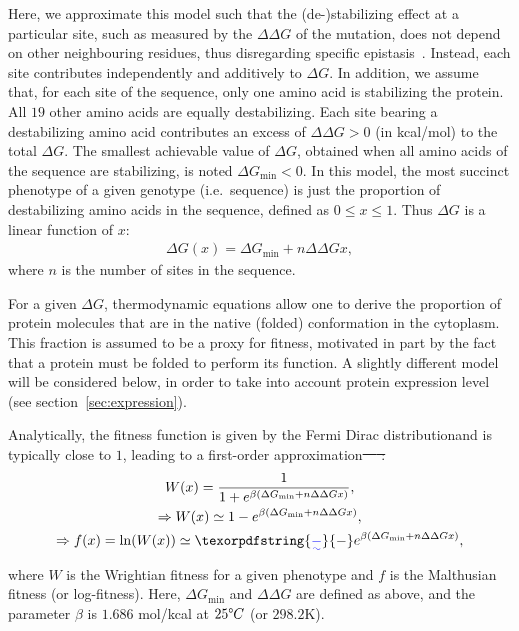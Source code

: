\documentclass[authoryear]{elsarticle} %
\newcommand{\wrightfit}{W} %
\newcommand{\logfit}{f} %
\newcommand{\NbrSites}{n} %
\newcommand{\G}{G} %
\newcommand{\DeltaG}{\Delta \G} %
\newcommand{\EmpiricalDeltaDeltaG}{\Delta \DeltaG} %
\newcommand{\EmpiricalDeltaGmin}{\DeltaG_{\text{min}}} %
\providecommand{\DIFaddtex}[1]{{\protect\color{blue}\uwave{#1}}} %
\providecommand{\DIFdeltex}[1]{{\protect\color{red}\sout{#1}}}                      %
\providecommand{\DIFaddbegin}{} %
\providecommand{\DIFaddend}{} %
\providecommand{\DIFdelbegin}{} %
\providecommand{\DIFdelend}{} %
\providecommand{\DIFadd}[1]{\texorpdfstring{\DIFaddtex{#1}}{#1}} %
\providecommand{\DIFdel}[1]{\texorpdfstring{\DIFdeltex{#1}}{}} %
\begin{document}
Here, we approximate this model such that the (de-)stabilizing effect at a particular site, such as measured by the $\EmpiricalDeltaDeltaG$ of the mutation, does not depend on other neighbouring residues, thus disregarding specific epistasis~\citep{Dasmeh2014}.
Instead, each site contributes independently and additively to $\DeltaG$.
In addition, we assume that, for each site of the sequence, only one amino acid is stabilizing the protein.
All $19$ other amino acids are equally destabilizing.
Each site bearing a destabilizing amino acid contributes an excess of $\EmpiricalDeltaDeltaG > 0$ (in kcal/mol) to the total $\DeltaG$.
The smallest achievable value of $\DeltaG$, obtained when all amino acids of the sequence are stabilizing, is noted $ \EmpiricalDeltaGmin < 0$.
In this model, the most succinct {phenotype} of a given genotype (i.e.~sequence) is just the proportion of destabilizing amino acids in the sequence, defined as $0 \leq x \leq 1$.
Thus $\DeltaG$ is a linear function of $x$:
\begin{align}
    \DeltaG (x) = \EmpiricalDeltaGmin + \NbrSites \EmpiricalDeltaDeltaG x,
\end{align}
where $\NbrSites$ is the number of sites in the sequence.

For a given $\DeltaG$, thermodynamic equations allow one to derive the proportion of protein molecules that are in the native (folded) conformation in the cytoplasm.
This fraction is assumed to be a proxy for fitness, motivated in part by the fact that a protein must be folded to perform its function.
A slightly different model will be considered below, in order to take into account protein expression level (see section~\ref{sec:expression}).

Analytically, the fitness function is given by the Fermi Dirac distribution\DIFaddbegin \DIFadd{~\mbox{%
\citep{Goldstein2011} }\hspace{0pt}%
}\DIFaddend and is typically close to $1$\DIFaddbegin \DIFadd{~\mbox{%
\citep{Serohijos2014}}\hspace{0pt}%
}\DIFaddend , leading to a first-order approximation\DIFdelbegin \DIFdel{~\mbox{%
\citep{Goldstein2011}}\hspace{0pt}%
:
}\DIFdelend \DIFaddbegin \DIFadd{:
}\DIFaddend \begin{gather}
    \wrightfit (x) = \dfrac{1}{1 + e^{\beta (\EmpiricalDeltaGmin + \NbrSites \EmpiricalDeltaDeltaG x)}},\\
    \Rightarrow \wrightfit (x) \simeq 1 - e^{\beta (\EmpiricalDeltaGmin + \NbrSites \EmpiricalDeltaDeltaG x)},\\
    \Rightarrow \logfit (x) = \ln ( \wrightfit (x) ) \simeq \DIFaddbegin \DIFadd{- }\DIFaddend e^{\beta (\EmpiricalDeltaGmin + \NbrSites \EmpiricalDeltaDeltaG x)},
\end{gather}
where $\wrightfit$ is the Wrightian fitness for a given {phenotype} and $\logfit $ is the Malthusian fitness (or log-fitness).
Here, $\EmpiricalDeltaGmin$ and $\EmpiricalDeltaDeltaG$ are defined as above, and the parameter $\beta$ is $1.686$ mol/kcal at $25 \degree C$ (or $298.2$K).
\end{document}
